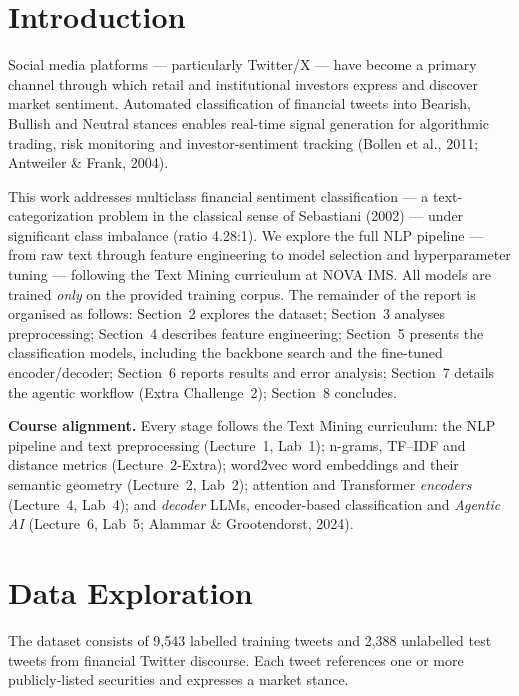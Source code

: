\documentclass[11pt,a4paper]{article}
\begin{document}
\section{Introduction}
Social media platforms --- particularly Twitter/X --- have become a primary channel through which
retail and institutional investors express and discover market sentiment. Automated classification
of financial tweets into Bearish, Bullish and Neutral stances enables real-time signal generation
for algorithmic trading, risk monitoring and investor-sentiment tracking (Bollen et al., 2011;
Antweiler \& Frank, 2004).

This work addresses multiclass financial sentiment classification --- a text-categorization
problem in the classical sense of Sebastiani (2002) --- under significant class imbalance
(ratio 4.28:1). We explore the full NLP pipeline --- from raw text through feature engineering to
model selection and hyperparameter tuning --- following the Text Mining curriculum at NOVA IMS. All
models are trained \emph{only} on the provided training corpus. The remainder of the report is
organised as follows: Section~2 explores the dataset; Section~3 analyses preprocessing; Section~4
describes feature engineering; Section~5 presents the classification models, including the backbone
search and the fine-tuned encoder/decoder; Section~6 reports results and error analysis; Section~7
details the agentic workflow (Extra Challenge~2); Section~8 concludes.

\textbf{Course alignment.} Every stage follows the Text Mining curriculum: the NLP pipeline and
text preprocessing (Lecture~1, Lab~1); n-grams, TF--IDF and distance metrics (Lecture~2-Extra);
word2vec word embeddings and their semantic geometry (Lecture~2, Lab~2); attention and Transformer
\emph{encoders} (Lecture~4, Lab~4); and \emph{decoder} LLMs, encoder-based classification and
\emph{Agentic AI} (Lecture~6, Lab~5; Alammar \& Grootendorst, 2024).

\section{Data Exploration}
The dataset consists of 9{,}543 labelled training tweets and 2{,}388 unlabelled test tweets from
financial Twitter discourse. Each tweet references one or more publicly-listed securities and
expresses a market stance.
\end{document}
